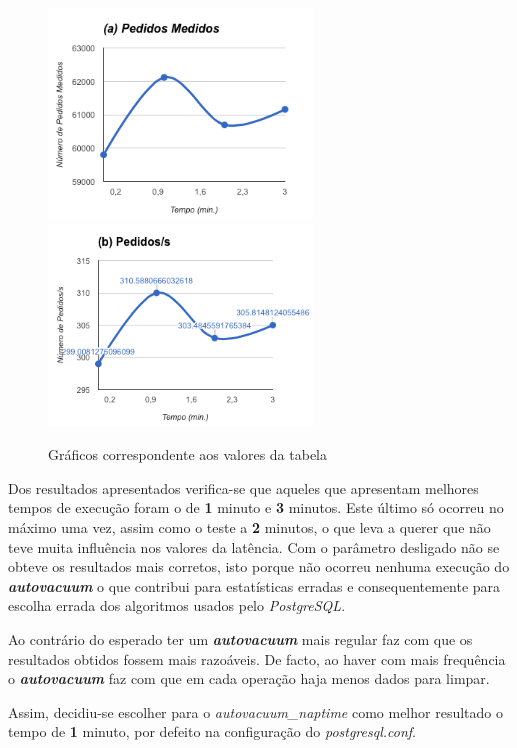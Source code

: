\begin{figure}[ht!]
\centering
\includegraphics[width=70mm]{img/05_vacuum_a.png}
\includegraphics[width=70mm]{img/05_vacuum_b.png}
\caption{Gráficos correspondente aos valores da tabela \label{overflow}}
\end{figure}

Dos resultados apresentados verifica-se que aqueles que apresentam melhores tempos de execução foram o de \textbf{1} minuto e \textbf{3} minutos. Este último só ocorreu no máximo uma vez, assim como o teste a \textbf{2} minutos, o que leva a querer que não teve muita influência nos valores da latência. Com o parâmetro desligado não se obteve os resultados mais corretos, isto porque não ocorreu nenhuma execução do \textit{\textbf{autovacuum}} o que contribui para estatísticas erradas e consequentemente para escolha errada dos algoritmos usados pelo \textit{PostgreSQL}.

Ao contrário do esperado ter um \textit{\textbf{autovacuum}} mais regular faz com que os resultados obtidos fossem mais razoáveis. De facto, ao haver com mais frequência o \textit{\textbf{autovacuum}} faz com que em cada operação haja menos dados para limpar.

Assim, decidiu-se escolher para o \textit{autovacuum\_naptime} como melhor resultado o tempo de \textbf{1} minuto, por defeito na configuração do \textit{postgresql.conf}.

\newpage

